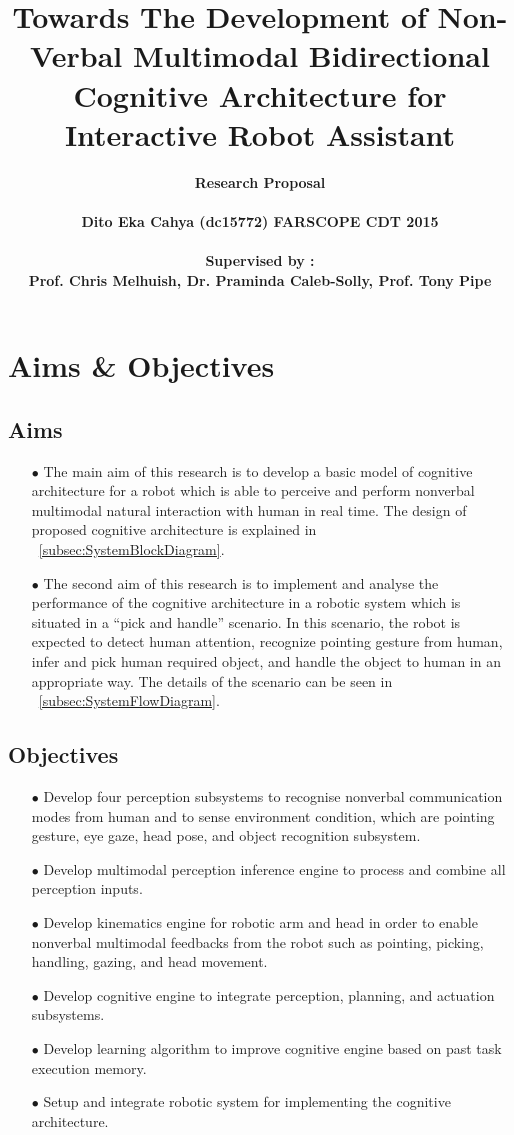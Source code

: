 \documentclass[11pt]{article}
\author{\bf \LARGE Research Proposal \\ \\ \bf Dito Eka Cahya (dc15772) FARSCOPE CDT 2015 \\\\ Supervised by : \\ Prof. Chris Melhuish, Dr. Praminda Caleb-Solly, Prof. Tony Pipe}
\date{}
\begin{document}
\title{\bf Towards The Development of Non-Verbal Multimodal Bidirectional Cognitive Architecture for Interactive Robot Assistant}
\maketitle
	\section{Aims \& Objectives}
		\subsection{Aims}
			\begin{itemize}
				\item[$\bullet$]The main aim of this research is to develop a basic model of cognitive architecture for a robot which is able to perceive and perform nonverbal multimodal natural interaction with human in real time. The design of proposed cognitive architecture is explained in ~\autoref{subsec:SystemBlockDiagram}.
				\item[$\bullet$]The second aim of this research is to implement and analyse the performance of the cognitive architecture in a robotic system which is situated in a “pick and handle” scenario. In this scenario, the robot is expected to detect human attention, recognize pointing gesture from human, infer and pick human required object, and handle the object to human in an appropriate way. The details of the scenario can be seen in ~\autoref{subsec:SystemFlowDiagram}.
			\end{itemize}
		\subsection{Objectives}
			\begin{itemize}
				\item[$\bullet$]Develop four perception subsystems to recognise nonverbal communication modes from human and to sense environment condition, which are pointing gesture, eye gaze, head pose, and object recognition subsystem.
				\item[$\bullet$]Develop multimodal perception inference engine to process and combine all perception inputs.
				\item[$\bullet$]Develop kinematics engine for robotic arm and head in order to enable nonverbal multimodal feedbacks from the robot such as pointing, picking, handling, gazing, and head movement.
				\item[$\bullet$]Develop cognitive engine to integrate perception, planning, and actuation subsystems.
				\item[$\bullet$]Develop learning algorithm to improve cognitive engine based on past task execution memory.
				\item[$\bullet$]Setup and integrate robotic system for implementing the cognitive architecture.
			\end{itemize}
\end{document}
